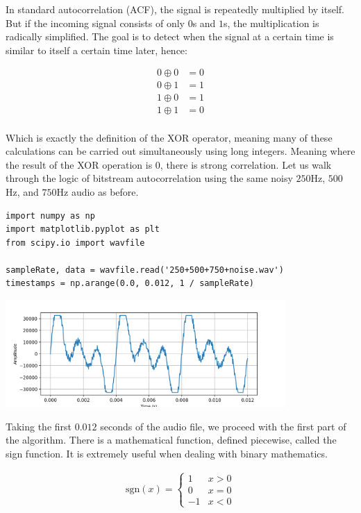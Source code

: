 \documentclass{article}
\begin{document}
In standard autocorrelation (ACF), the signal is repeatedly multiplied by itself. But if the incoming signal consists of only $0$s and $1$s, the multiplication is radically simplified. The goal is to detect when the signal at a certain time is similar to itself a certain time later, hence:

\begin{align*}
    0 \oplus{0} & = 0 \\
    0 \oplus{1} & = 1 \\
    1 \oplus{0} & = 1 \\ 
    1 \oplus{1} & = 0 \\
\end{align*}

Which is exactly the definition of the XOR operator, meaning many of these calculations can be carried out simultaneously using long integers. Meaning where the result of the XOR operation is 0, there is strong correlation. Let us walk through the logic of bitstream autocorrelation using the same noisy $250$Hz, $500$Hz, and $750$Hz audio as before.

\begin{verbatim}
import numpy as np
import matplotlib.pyplot as plt
from scipy.io import wavfile

sampleRate, data = wavfile.read('250+500+750+noise.wav')
timestamps = np.arange(0.0, 0.012, 1 / sampleRate)
\end{verbatim}

\begin{center} \includegraphics[width=0.8\textwidth]{img/bsac_original.png} \end{center}

Taking the first $0.012$ seconds of the audio file, we proceed with the first part of the algorithm. There is a mathematical function, defined piecewise, called the sign function. It is extremely useful when dealing with binary mathematics.

\begin{align*}
    \text{sgn}(x) =  \begin{cases} 1 & x > 0 \\ 0 & x = 0 \\ -1 & x < 0 \end{cases}
\end{align*}
\end{document}
